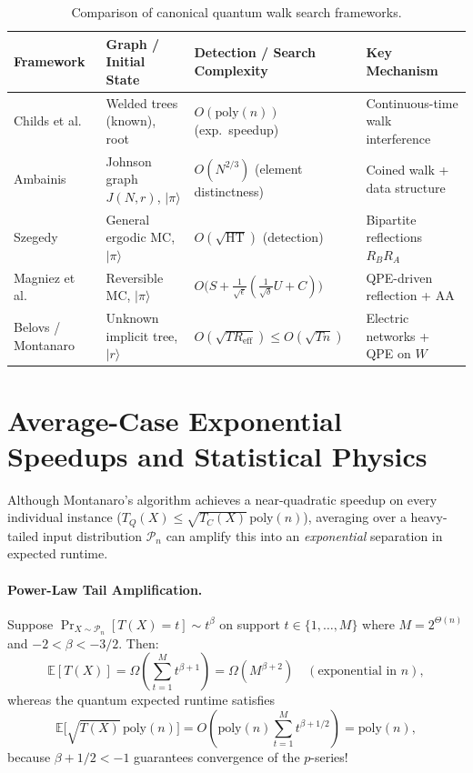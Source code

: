 \documentclass[11pt,a4paper]{article}
\begin{document}
\begin{table}[h!]
\centering
\small
\begin{tabular}{@{}llll@{}}
\toprule
\textbf{Framework} & \textbf{Graph / Initial State} & \textbf{Detection / Search Complexity} & \textbf{Key Mechanism} \\
\midrule
Childs et al.~\cite{childs2003} & Welded trees (known), root & $O(\mathrm{poly}(n))$ (exp.\ speedup) & Continuous-time walk interference \\
Ambainis~\cite{ambainis2004} & Johnson graph $J(N, r)$, $|\pi\rangle$ & $O(N^{2/3})$ (element distinctness) & Coined walk + data structure \\
Szegedy~\cite{szegedy2004} & General ergodic MC, $|\pi\rangle$ & $O(\sqrt{\mathrm{HT}})$ (detection) & Bipartite reflections $R_B R_A$ \\
Magniez et al.~\cite{magniez2011} & Reversible MC, $|\pi\rangle$ & $O\bigl(S + \frac{1}{\sqrt{\epsilon}}(\frac{1}{\sqrt{\delta}}U + C)\bigr)$ & QPE-driven reflection + AA \\
Belovs / Montanaro~\cite{belovs2013,montanaro2015} & Unknown implicit tree, $|r\rangle$ & $O(\sqrt{T R_{\mathrm{eff}}}) \le O(\sqrt{Tn})$ & Electric networks + QPE on $W$ \\
\bottomrule
\end{tabular}
\caption{Comparison of canonical quantum walk search frameworks.}
\label{tab:qw-survey}
\end{table}

\section{Average-Case Exponential Speedups and Statistical Physics}

Although Montanaro's algorithm achieves a near-quadratic speedup on every individual instance ($T_Q(X) \le \sqrt{T_C(X)}\,\mathrm{poly}(n)$), averaging over a heavy-tailed input distribution $\mathcal{P}_n$ can amplify this into an \emph{exponential} separation in expected runtime.

\paragraph{Power-Law Tail Amplification.}
Suppose $\Pr_{X \sim \mathcal{P}_n}[T(X) = t] \sim t^\beta$ on support $t \in \{1, \dots, M\}$ where $M = 2^{\Theta(n)}$ and $-2 < \beta < -3/2$. Then:
\[
\mathbb{E}[T(X)] = \Omega\!\left(\sum_{t=1}^{M} t^{\beta+1}\right) = \Omega(M^{\beta+2}) \quad (\text{exponential in } n),
\]
whereas the quantum expected runtime satisfies
\[
\mathbb{E}\bigl[\sqrt{T(X)}\,\mathrm{poly}(n)\bigr] = O\!\left(\mathrm{poly}(n) \sum_{t=1}^{M} t^{\beta + 1/2}\right) = \mathrm{poly}(n),
\]
because $\beta + 1/2 < -1$ guarantees convergence of the $p$-series!
\end{document}
